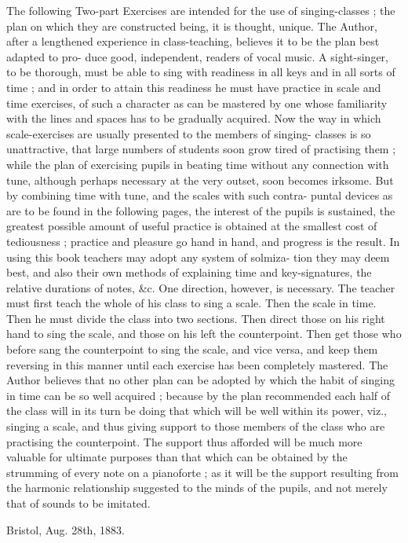 The following Two-part Exercises are intended for the use of 
singing-classes ; the plan on which they are constructed being, 
it is thought, unique. The Author, after a lengthened experience 
in class-teaching, believes it to be the plan best adapted to pro- 
duce good, independent, readers of vocal music. A sight-singer, to 
be thorough, must be able to sing with readiness in all keys and 
in all sorts of time ; and in order to attain this readiness he must 
have practice in scale and time exercises, of such a character as 
can be mastered by one whose familiarity with the lines and 
spaces has to be gradually acquired. Now the way in which 
scale-exercises are usually presented to the members of singing- 
classes is so unattractive, that large numbers of students soon 
grow tired of practising them ; while the plan of exercising pupils 
in beating time without any connection with tune, although 
perhaps necessary at the very outset, soon becomes irksome. But 
by combining time with tune, and the scales with such contra- 
puntal devices as are to be found in the following pages, the 
interest of the pupils is sustained, the greatest possible amount 
of useful practice is obtained at the smallest cost of tediousness ; 
practice and pleasure go hand in hand, and progress is the result. 
In using this book teachers may adopt any system of solmiza- 
tion they may deem best, and also their own methods of explaining 
time and key-signatures, the relative durations of notes, &c. 
One direction, however, is necessary. The teacher must first 
teach the whole of his class to sing a scale. Then the scale in 
time. Then he must divide the class into two sections. Then 
direct those on his right hand to sing the scale, and those on 
his left the counterpoint. Then get those who before sang the 
counterpoint to sing the scale, and vice versa, and keep them 
reversing in this manner until each exercise has been completely 
mastered. The Author believes that no other plan can be 
adopted by which the habit of singing in time can be so well 
acquired ; because by the plan recommended each half of the 
class will in its turn be doing that which will be well within its 
power, viz., singing a scale, and thus giving support to those 
members of the class who are practising the counterpoint. The 
support thus afforded will be much more valuable for ultimate 
purposes than that which can be obtained by the strumming of 
every note on a pianoforte ; as it will be the support resulting 
from the harmonic relationship suggested to the minds of the 
pupils, and not merely that of sounds to be imitated. 

Bristol, Aug. 28th, 1883. 

